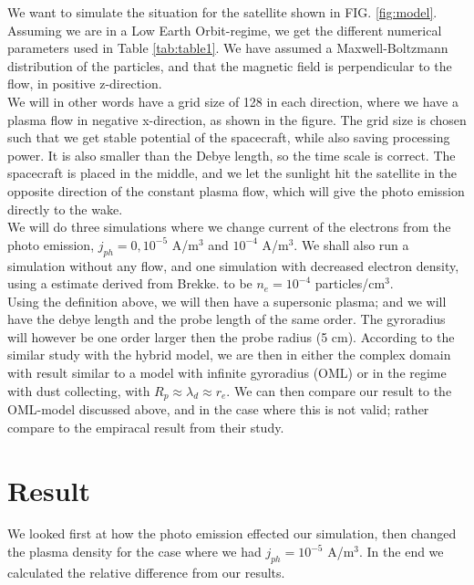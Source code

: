 \documentclass[aip, 
rsi, 
amsmath,
amssymb,
longbibliography,
preprint]{revtex4-1}
\begin{document}
We want to simulate the situation for the satellite shown in FIG. \ref{fig:model}. Assuming we are in a Low Earth Orbit-regime, we get the different numerical parameters used in Table \ref{tab:table1}. We have  assumed a Maxwell-Boltzmann distribution of the particles, and that the magnetic field is perpendicular to the flow, in positive z-direction.\\

 We will in other words have a grid size of 128 in each direction, where we have a plasma flow in negative x-direction, as shown in the figure. The grid size is chosen such that we get stable potential of the spacecraft, while also saving processing power. It is also smaller than the Debye length, so the time scale is correct. The spacecraft is placed in the middle, and we let the sunlight hit the satellite in the opposite direction of the constant plasma flow, which will give the photo emission directly to the wake.\\
 
 We will do three simulations where we change current of the electrons from the photo emission, $j_{ph} = 0, 10^{-5}$ A/m$^3$ and $10^{-4}$ A/m$^3$. We shall also run a simulation without any flow, and one simulation with decreased electron density, using a estimate derived from Brekke.\cite{Brekke} to be $n_e = 10^{-4}$ particles/cm$^3$.\\
 
Using the definition above, we will then have a supersonic plasma; and we will have the debye length and the probe length of the same order. The gyroradius will however be one order larger then the probe radius (5 cm). According to the similar study with the hybrid model\cite{P7}, we are then in either the complex domain with result similar to a model with infinite gyroradius (OML) or in the regime with dust collecting, with $R_p \approx \lambda_d \approx r_e$. We can then compare our result to the OML-model discussed above, and in the case where this is not valid; rather compare to the empiracal result from their study.

\section{Result}

We looked first at how the photo emission effected our simulation, then changed the plasma density for the case where we had $j_{ph} = 10^{-5}$ A/m$^3$. In the end we calculated the relative difference from our results.
\end{document}
